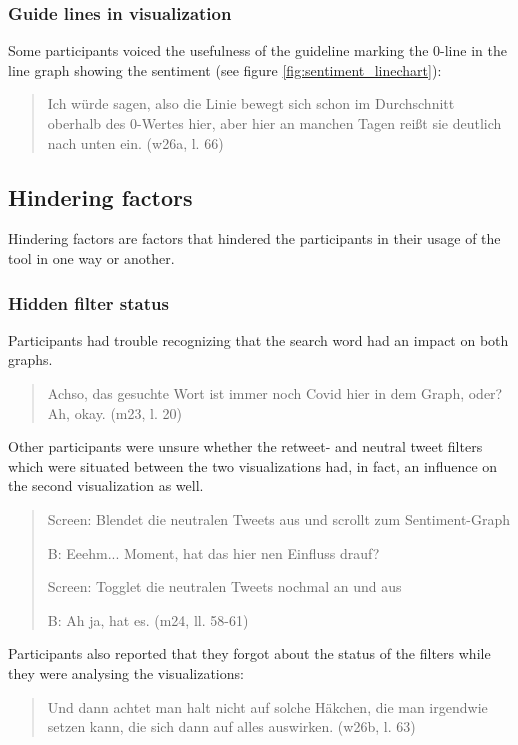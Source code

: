 \subsubsection*{Guide lines in visualization}
Some participants voiced the usefulness of the guideline marking the 0-line in the line graph showing the sentiment (see figure \ref{fig:sentiment_linechart}):

\begin{quote}
    Ich würde sagen, also die Linie bewegt sich schon im Durchschnitt oberhalb des 0-Wertes hier, aber hier an manchen Tagen reißt sie deutlich nach unten ein. (w26a, l. 66)
\end{quote}

\clearpage
\subsection{Hindering factors}
Hindering factors are factors that hindered the participants in their usage of the tool in one way or another.

\subsubsection*{Hidden filter status}
Participants had trouble recognizing that the search word had an impact on both graphs.

\begin{quote}
    Achso, das gesuchte Wort ist immer noch Covid hier in dem Graph, oder? Ah, okay. (m23, l. 20)
\end{quote}

Other participants were unsure whether the retweet- and neutral tweet filters which were situated between the two visualizations had, in fact, an influence on the second visualization as well.

\begin{quote}
    Screen: Blendet die neutralen Tweets aus und scrollt zum Sentiment-Graph

    B: Eeehm... Moment, hat das hier nen Einfluss drauf?

    Screen: Togglet die neutralen Tweets nochmal an und aus

    B: Ah ja, hat es. (m24, ll. 58-61)
\end{quote}

Participants also reported that they forgot about the status of the filters while they were analysing the visualizations:

\begin{quote}
    Und dann achtet man halt nicht auf solche Häkchen, die man irgendwie setzen kann, die sich dann auf alles auswirken. (w26b, l. 63)
\end{quote}

